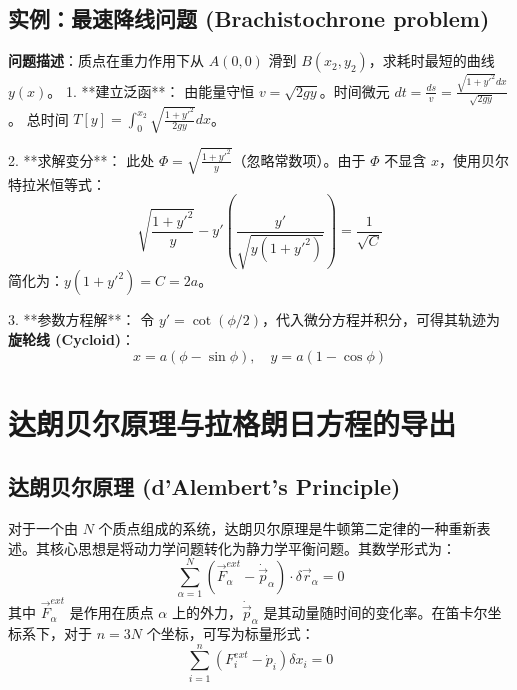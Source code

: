 \documentclass[11pt,a4paper]{article}
\begin{document}
\subsection{实例：最速降线问题 (Brachistochrone problem)}



\textbf{问题描述}：质点在重力作用下从 $A(0,0)$ 滑到 $B(x_2, y_2)$，求耗时最短的曲线 $y(x)$。
1. **建立泛函**：
   由能量守恒 $v = \sqrt{2gy}$。时间微元 $dt = \frac{ds}{v} = \frac{\sqrt{1+y'^2}dx}{\sqrt{2gy}}$。
   总时间 $T[y] = \int_0^{x_2} \sqrt{\frac{1+y'^2}{2gy}} dx$。

2. **求解变分**：
   此处 $\Phi = \sqrt{\frac{1+y'^2}{y}}$（忽略常数项）。由于 $\Phi$ 不显含 $x$，使用贝尔特拉米恒等式：
   \[ \sqrt{\frac{1+y'^2}{y}} - y' \left( \frac{y'}{\sqrt{y(1+y'^2)}} \right) = \frac{1}{\sqrt{C}} \]
   简化为：$y(1+y'^2) = C = 2a$。

3. **参数方程解**：
   令 $y' = \cot(\phi/2)$，代入微分方程并积分，可得其轨迹为\textbf{旋轮线 (Cycloid)}：
   \[ \boxed{x = a(\phi - \sin\phi), \quad y = a(1 - \cos\phi)} \]


\section{达朗贝尔原理与拉格朗日方程的导出}

\subsection{达朗贝尔原理 (d'Alembert's Principle)}
对于一个由 $N$ 个质点组成的系统，达朗贝尔原理是牛顿第二定律的一种重新表述。其核心思想是将动力学问题转化为静力学平衡问题。其数学形式为：
\[ \sum_{\alpha=1}^{N}(\vec{F}_{\alpha}^{ext}-\dot{\vec{p}}_{\alpha})\cdot\delta \vec{r}_{\alpha}=0 \]
其中 $\vec{F}_{\alpha}^{ext}$ 是作用在质点 $\alpha$ 上的外力，$\dot{\vec{p}}_{\alpha}$ 是其动量随时间的变化率。在笛卡尔坐标系下，对于 $n=3N$ 个坐标，可写为标量形式：
\[ \sum_{i=1}^{n}(F_{i}^{ext}-\dot{p}_{i})\delta x_{i}=0 \]
\end{document}
